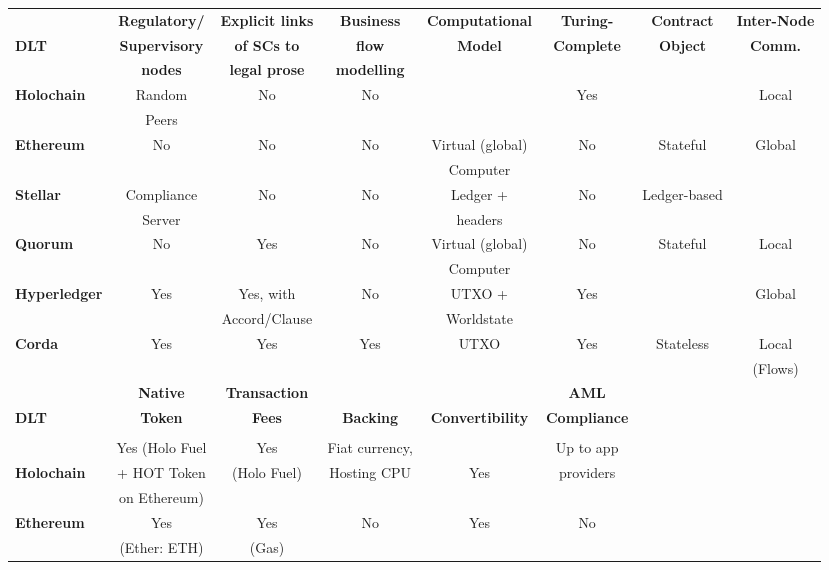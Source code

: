 \begin{table}
\small
\begin{centering}
{\begin{tabular}{| l | c | c | c | c | c | c | c |}
\hline
				& \textbf{Regulatory/} 	& \textbf{Explicit links}	&\textbf{Business}
				& \textbf{Computational} 		& \textbf{Turing-}		&\textbf{Contract}	& \textbf{Inter-Node}	\\
\textbf{DLT}		& \textbf{Supervisory} 	& \textbf{of SCs to}		&\textbf{flow} 
				& \textbf{Model} 			& \textbf{Complete}		&\textbf{Object}		& \textbf{Comm.} \\
				& \textbf{nodes} 		& \textbf{legal prose}		&\textbf{modelling} 
				& \textbf{} 		& \textbf{}				&\textbf{} 			&\\
\hline
\hline
\textbf{Holochain}	&Random				&No			&No 		&				&Yes
				&					&Local \\
				&Peers				&			& 		&				&
				&					& \\
\hline
\textbf{Ethereum}	&No					&No			&No		&Virtual (global)			&No
				&Stateful 				&Global \\
				&					&			&		&Computer		&
				& 					& \\
\hline

\textbf{Stellar}		&Compliance			&No			&No 		&Ledger +			&No
				&Ledger-based			& \\
				&Server				&			& 		&headers			&
				&					& \\				
\hline
\textbf{Quorum} 	&No					&Yes			&No 		&Virtual (global)	&No
				&Stateful				&Local \\
				&					&			& 		&Computer		&
				&					& \\
\hline
\textbf{Hyperledger}	&Yes					&Yes, with		&No 		&UTXO +			&Yes
				&					&Global \\
 				&					&Accord/Clause& 		&Worldstate		&
				&					& \\
\hline
\textbf{Corda} 		&Yes					&Yes			&Yes		&UTXO			&Yes	
				&Stateless			&Local \\
				&					&			&		&				&		
				&					&(Flows) \\
\hline
\hline
\hline
\hline
				& \textbf{Native} 		& \textbf{Transaction}&\textbf{}
				& \textbf{}  			& \textbf{AML}  		& \textbf{} 		& \\
\textbf{DLT}		& \textbf{Token} 		& \textbf{Fees}		&\textbf{Backing} 
				& \textbf{Convertibility}	& \textbf{Compliance} & \textbf{} 	& \textbf{} \\
				& \textbf{} 				& \textbf{}			&\textbf{}
				& \textbf{} 				& \textbf{} 			& \textbf{} 		&\\
\hline
\hline
			 	&Yes (Holo Fuel&Yes		&Fiat currency,
				& 			&Up to app	&				& \\
\textbf{Holochain}	&+ HOT Token	&(Holo Fuel)	&Hosting CPU
				&Yes			&providers	&				& \\
				&on Ethereum)	&			&
				& 			&			&				& \\ 
\hline
\textbf{Ethereum}	&Yes			&Yes			&No 
				&Yes			&No			&				& \\
				&(Ether: ETH)	&(Gas)		& 
				& 			&			&				& \\
\hline


\end{tabular}}
\end{centering}
\end{table}

